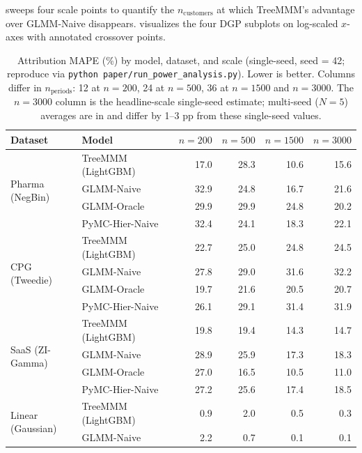 \documentclass[review,12pt]{elsarticle}
\begin{document}
 sweeps four scale points to quantify the $n_\text{customers}$
at which TreeMMM's advantage over GLMM-Naive disappears.
 visualizes the four DGP subplots on log-scaled $x$-axes with
annotated crossover points.

\begin{table}[p]
\centering
\small
\caption{Attribution MAPE (\%) by model, dataset, and scale (single-seed,
         seed = 42; reproduce via \texttt{python paper/run\_power\_analysis.py}).
         Lower is better. Columns differ in $n_\text{periods}$: 12 at
         $n{=}200$, 24 at $n{=}500$, 36 at $n{=}1500$ and $n{=}3000$.
         The $n{=}3000$ column is the headline-scale single-seed estimate;
         multi-seed ($N{=}5$) averages are in  and differ by
         1--3 pp from these single-seed values.}
\label{tab:power}
{\footnotesize
\setlength{\tabcolsep}{4pt}
\renewcommand{\arraystretch}{0.94}
\begin{tabular}{@{}lllrrrr@{}}
\toprule
Dataset & Model & & $n{=}200$ & $n{=}500$ & $n{=}1500$ & $n{=}3000$ \\
\midrule
\multirow{4}{*}{Pharma (NegBin)}
  & TreeMMM (LightGBM) & & 17.0 & 28.3 & 10.6 & 15.6 \\
  & GLMM-Naive         & & 32.9 & 24.8 & 16.7 & 21.6 \\
  & GLMM-Oracle        & & 29.9 & 29.9 & 24.8 & 20.2 \\
  & PyMC-Hier-Naive    & & 32.4 & 24.1 & 18.3 & 22.1 \\
\midrule
\multirow{4}{*}{CPG (Tweedie)}
  & TreeMMM (LightGBM) & & 22.7 & 25.0 & 24.8 & 24.5 \\
  & GLMM-Naive         & & 27.8 & 29.0 & 31.6 & 32.2 \\
  & GLMM-Oracle        & & 19.7 & 21.6 & 20.5 & 20.7 \\
  & PyMC-Hier-Naive    & & 26.1 & 29.1 & 31.4 & 31.9 \\
\midrule
\multirow{4}{*}{SaaS (ZI-Gamma)}
  & TreeMMM (LightGBM) & & 19.8 & 19.4 & 14.3 & 14.7 \\
  & GLMM-Naive         & & 28.9 & 25.9 & 17.3 & 18.3 \\
  & GLMM-Oracle        & & 27.0 & 16.5 & 10.5 & 11.0 \\
  & PyMC-Hier-Naive    & & 27.2 & 25.6 & 17.4 & 18.5 \\
\midrule
\multirow{4}{*}{Linear (Gaussian)}
  & TreeMMM (LightGBM) & & 0.9 & 2.0 & 0.5 & 0.3  \\
  & GLMM-Naive         & & 2.2 & 0.7 & 0.1 & 0.1  \\

\end{tabular}}
\end{table}
\end{document}
